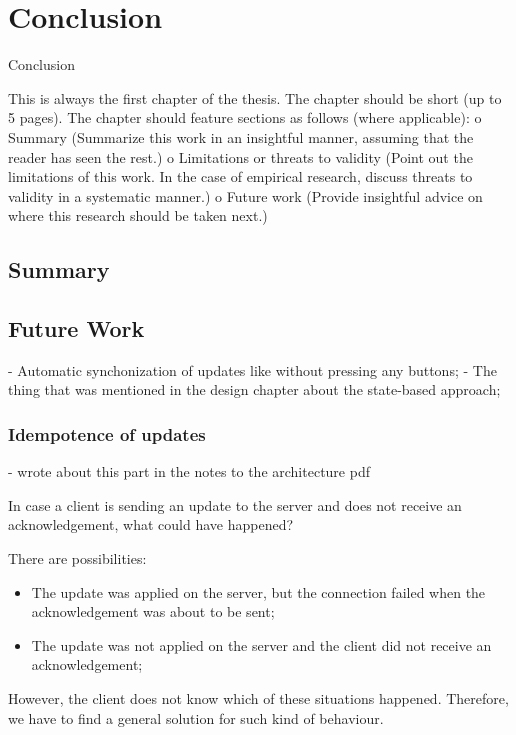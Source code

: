\chapter{Conclusion}
\label{Conclusion}

Conclusion

This is always the first chapter of the thesis. The chapter should be short (up to 5 pages). The chapter should feature sections as follows (where applicable): o Summary (Summarize this work in an insightful manner, assuming that the reader has seen the rest.) o Limitations or threats to validity (Point out the limitations of this work. In the case of empirical research, discuss threats to validity in a systematic manner.) o Future work (Provide insightful advice on where this research should be taken next.)

\section{Summary}
\label{summary}

\section{Future Work}
\label{futurework}

- Automatic synchonization of updates like without pressing any buttons;
- The thing that was mentioned in the design chapter about the state-based approach;

\subsection*{Idempotence of updates}

- wrote about this part in the notes to the architecture pdf



In case a client is sending an update to the server and does not receive an acknowledgement, what could have happened?

There are possibilities:
\begin{itemize}
    \item {The update was applied on the server, but the connection failed when the acknowledgement was about to be sent;}
    \item {The update was not applied on the server and the client did not receive an acknowledgement;}
\end{itemize}
However, the client does not know which of these situations happened. Therefore, we have to find a general solution for such kind of behaviour. 

